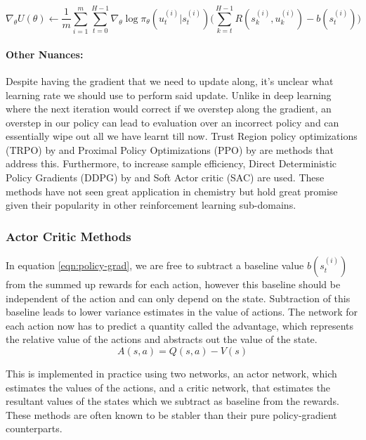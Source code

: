 \begin{equation}\label{eqn:policy-grad}
    \nabla_\theta U(\theta) \leftarrow \frac{1}{m} \sum_{i=1}^{m} \sum_{t=0}^{H-1} \nabla_\theta \log \pi_\theta (u_t^{(i)}|s_t^{(i)}) \Bigg(\sum_{k=t}^{H-1} R(s_k^{(i)}, u_k^{(i)}) - b(s_t^{(i)})\Bigg)
\end{equation}

\paragraph{Other Nuances:} Despite having the gradient that we need to update along, it's unclear what learning rate we should use to perform said update. Unlike in deep learning where the next iteration would correct if we overstep along the gradient, an overstep in our policy can lead to evaluation over an incorrect policy and can essentially wipe out all we have learnt till now. Trust Region policy optimizations (TRPO) by \cite{trpo} and Proximal Policy Optimizations (PPO) by \cite{ppo} are methods that address this. Furthermore, to increase sample efficiency, Direct Deterministic Policy Gradients (DDPG) by \cite{ddpg} and Soft Actor critic (SAC) \cite{sac} are used. These methods have not seen great application in chemistry but hold great promise given their popularity in other reinforcement learning sub-domains.

\subsubsection{Actor Critic Methods}

In equation \ref{eqn:policy-grad}, we are free to subtract a baseline value $b(s_t^{(i)})$ from the summed up rewards for each action, however this baseline should be independent of the action and can only depend on the state. Subtraction of this baseline leads to lower variance estimates in the value of actions. The network for each action now has to predict a quantity called the advantage, which represents the relative value of the actions and abstracts out the value of the state.
\begin{equation}\label{eqn:advantage}
    A(s, a) = Q(s, a) - V(s)
\end{equation}

This is implemented in practice using two networks, an actor network, which estimates the values of the actions, and a critic network, that estimates the resultant values of the states which we subtract as baseline from the rewards. These methods are often known to be stabler than their pure policy-gradient counterparts.

